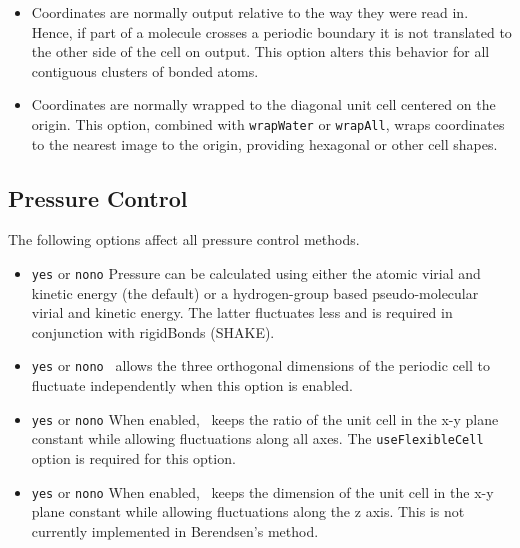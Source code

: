 \begin{itemize}
\item
{}
{Coordinates are normally output relative to the way they were read in.  Hence, if part of a molecule crosses a periodic boundary it is not translated to the other side of the cell on output.  This option alters this behavior for all contiguous clusters of bonded atoms.}

\item
{}
{Coordinates are normally wrapped to the diagonal unit cell centered on the origin.  This option, combined with {\tt wrapWater} or {\tt wrapAll}, wraps coordinates to the nearest image to the origin, providing hexagonal or other cell shapes.}

\end{itemize}

\subsection{Pressure Control}

The following options affect all pressure control methods.

\begin{itemize}

\item
{}
{{\tt yes} or {\tt no}}{{\tt no}}
{Pressure can be calculated using either the atomic virial and kinetic
energy (the default) or a hydrogen-group based pseudo-molecular
virial and kinetic energy.  The latter fluctuates less and is
required in conjunction with rigidBonds (SHAKE).}

\item
{}
{{\tt yes} or {\tt no}}{{\tt no}}
{\NAMD\ allows the three orthogonal dimensions of the periodic cell
to fluctuate independently when this option is enabled.}

\item
{}
{{\tt yes} or {\tt no}}{{\tt no}}
{When enabled, \NAMD\ keeps the ratio of the unit cell in the x-y plane 
constant while allowing fluctuations along all axes.  The {\tt useFlexibleCell} option is required for this option.}

\item
{}
{{\tt yes} or {\tt no}}{{\tt no}}
{When enabled, \NAMD\ keeps the dimension of the unit cell in the x-y plane 
constant while allowing fluctuations along the z axis.
This is not currently implemented in Berendsen's method.}

\end{itemize}

